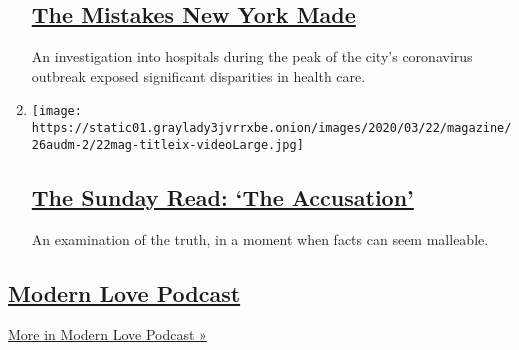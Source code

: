 \begin{enumerate}
  \hypertarget{the-mistakes-new-york-made}{%
  \subsection{\texorpdfstring{\href{/2020/07/27/podcasts/the-daily/new-york-hospitals-covid.html}{The
  Mistakes New York
  Made}}{The Mistakes New York Made}}\label{the-mistakes-new-york-made}}

  An investigation into hospitals during the peak of the city's
  coronavirus outbreak exposed significant disparities in health care.
\item
  \texttt{[image: https://static01.graylady3jvrrxbe.onion/images/2020/03/22/magazine/26audm-2/22mag-titleix-videoLarge.jpg]}

  \hypertarget{the-sunday-read-the-accusation}{%
  \subsection{\texorpdfstring{\href{/2020/07/26/podcasts/the-daily/the-accusation-the-sunday-read.html}{The
  Sunday Read: `The
  Accusation'}}{The Sunday Read: `The Accusation'}}\label{the-sunday-read-the-accusation}}

  An examination of the truth, in a moment when facts can seem
  malleable.
\end{enumerate}

\hypertarget{modern-love-podcast-1}{%
\subsection{\texorpdfstring{\href{/column/modern-love-podcast}{Modern
Love Podcast}}{Modern Love Podcast}}\label{modern-love-podcast-1}}

\href{/column/modern-love-podcast}{More in Modern Love Podcast »}

